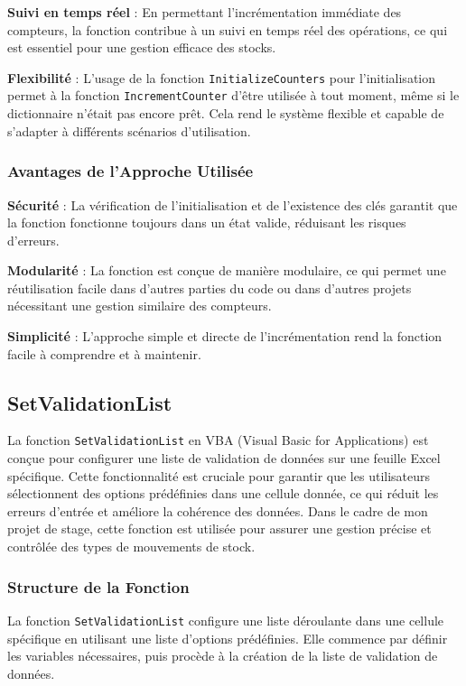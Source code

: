 \documentclass[a4paper, oneside, 12pt, final]{extreport}
\begin{document}
\textbf{Suivi en temps réel} : En permettant l'incrémentation immédiate des compteurs, la fonction contribue à un suivi en temps réel des opérations, ce qui est essentiel pour une gestion efficace des stocks.

\textbf{Flexibilité} : L'usage de la fonction \texttt{InitializeCounters} pour l'initialisation permet à la fonction \texttt{IncrementCounter} d'être utilisée à tout moment, même si le dictionnaire n'était pas encore prêt. Cela rend le système flexible et capable de s'adapter à différents scénarios d'utilisation.

\subsubsection{Avantages de l'Approche Utilisée}
\textbf{Sécurité} : La vérification de l'initialisation et de l'existence des clés garantit que la fonction fonctionne toujours dans un état valide, réduisant les risques d'erreurs.

\textbf{Modularité} : La fonction est conçue de manière modulaire, ce qui permet une réutilisation facile dans d'autres parties du code ou dans d'autres projets nécessitant une gestion similaire des compteurs.

\textbf{Simplicité} : L'approche simple et directe de l'incrémentation rend la fonction facile à comprendre et à maintenir.


\subsection{SetValidationList}
La fonction \texttt{SetValidationList} en VBA (Visual Basic for Applications) est conçue pour configurer une liste de validation de données sur une feuille Excel spécifique. Cette fonctionnalité est cruciale pour garantir que les utilisateurs sélectionnent des options prédéfinies dans une cellule donnée, ce qui réduit les erreurs d'entrée et améliore la cohérence des données. Dans le cadre de mon projet de stage, cette fonction est utilisée pour assurer une gestion précise et contrôlée des types de mouvements de stock.

\subsubsection{Structure de la Fonction}
La fonction \texttt{SetValidationList} configure une liste déroulante dans une cellule spécifique en utilisant une liste d'options prédéfinies. Elle commence par définir les variables nécessaires, puis procède à la création de la liste de validation de données.
\end{document}
